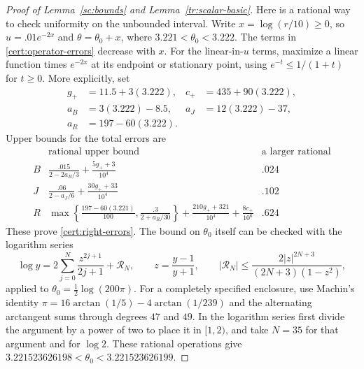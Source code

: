\begin{proof}[Proof of Lemma~\ref{sc:bounds} and Lemma~\ref{tr:scalar-basic}]
Here is a rational way to check uniformity on the unbounded interval.
Write $x=\log(r/10)\ge0$, so $u=.01e^{-2x}$ and
$\theta=\theta_0+x$, where $3.221<\theta_0<3.222$.
The terms in \eqref{cert:operator-errors} decrease with $x$. For the
linear-in-$u$ terms, maximize a linear function times $e^{-2x}$ at
its endpoint or stationary point, using $e^{-t}\le1/(1+t)$ for $t\ge0$.
More explicitly, set
\[
 \begin{aligned}
 g_+&=11.5+3(3.222),& c_+&=435+90(3.222),\\
 a_B&=3(3.222)-8.5,& a_J&=12(3.222)-37,\\
 a_R&=197-60(3.222).
 \end{aligned}
\]
Upper bounds for the total errors are
\[
 \begin{array}{c|l|c}
 &\text{rational upper bound}&\text{a larger rational}\\\hline
 B&\displaystyle\frac{.015}{2-2a_B/3}
                  +\frac{5g_++3}{10^4}&.024\\[2mm]
 J&\displaystyle\frac{.06}{2-a_J/6}
                  +\frac{30g_++33}{10^4}&.102\\[2mm]
 R&\displaystyle\max\left\{\frac{197-60(3.221)}{100},
                    \frac{.3}{2+a_R/30}\right\}
       +\frac{210g_++321}{10^4}+\frac{8c_+}{10^6}&.624
 \end{array}
\]
These prove \eqref{cert:right-errors}. The bound on $\theta_0$ itself
can be checked with the logarithm series
\[
 \log y=2\sum_{j=0}^{N}\frac{z^{2j+1}}{2j+1}+\mathcal R_N,\qquad
 z=\frac{y-1}{y+1},\qquad
 |\mathcal R_N|\le
 \frac{2|z|^{2N+3}}{(2N+3)(1-z^2)},
\]
applied to $\theta_0=\tfrac12\log(200\pi)$. For a completely
specified enclosure, use Machin's identity
$\pi=16\arctan(1/5)-4\arctan(1/239)$ and the alternating arctangent
sums through degrees $47$ and $49$. In the logarithm series first divide
the argument by a power of two to place it in $[1,2)$, and take $N=35$
for that argument and for $\log2$. These rational operations give
$3.221523626198<\theta_0<3.221523626199$.


\end{proof}
